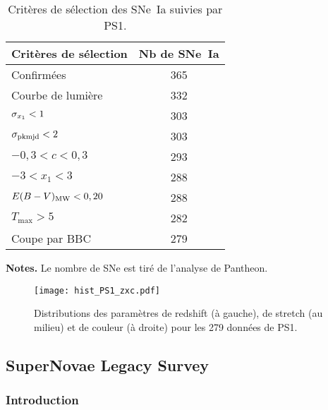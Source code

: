 \documentclass[../main/main.tex]{subfiles}
\begin{document}
\begin{table}[]
    \centering
    \begin{threeparttable}
        \caption{Critères de sélection des SNe~Ia suivies par PS1.}
        \label{tab:ps1cuts}
        \begin{tabular}{lc}
            \toprule
            Critères de sélection     & Nb de SNe~Ia \\
            \midrule
            Confirmées                & 365 \\
            Courbe de lumière         & 332 \\
            $\sigma_{x_1} < 1$            & 303 \\
            $\sigma_{\rm pkmjd} < 2$      & 303 \\
            $-0,3 < c < 0,3$          & 293 \\
            $-3 < x_1 < 3$            & 288 \\
            $E(B-V)_{\rm MW} < 0,20 $ & 288 \\
            $T_{\max} > 5$            & 282 \\
            \midrule
            Coupe par BBC             & 279 \\
            \bottomrule
        \end{tabular}
        \begin{tablenotes}[flushleft]
        \item \textbf{\hspace{-3,2pt}Notes.} Le nombre de SNe est tiré de
            l'analyse de Pantheon.
        \end{tablenotes}
    \end{threeparttable}
\end{table}

\begin{figure}[ht]
    \centering
    \texttt{[image: hist\_PS1\_zxc.pdf]}
    \captionsetup{justification=centering}
    \caption{Distributions des paramètres de redshift (à gauche), de stretch (au
    milieu) et de couleur (à droite) pour les 279 données de PS1.}
    \label{fig:ps1hist}
\end{figure}

\subsection{SuperNovae Legacy Survey}\label{ssec:snls}
\subsubsection{Introduction}\label{sssec:snlsintro}
\end{document}
